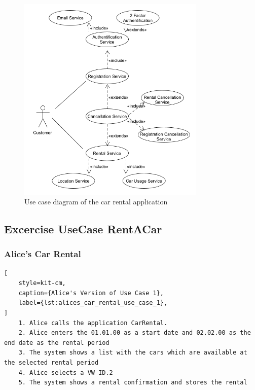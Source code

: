 \begin{figure}[H]
    \centering
    \includegraphics[width=0.8\textwidth]{figures/goLang/carRental/carRental_umlDiagram.png}
    \caption{Use case diagram of the car rental application}
    \label{fig:car_rental_use_case_diagram}
\end{figure}

\subsection{Excercise UseCase RentACar}
\label{sec:exercise_use_case_rent_a_car}
\subsubsection*{Alice's Car Rental}
\begin{lstlisting}[
    style=kit-cm,
    caption={Alice's Version of Use Case 1},
    label={lst:alices_car_rental_use_case_1},
]
    1. Alice calls the application CarRental.
    2. Alice enters the 01.01.00 as a start date and 02.02.00 as the end date as the rental period
    3. The system shows a list with the cars which are available at the selected rental period
    4. Alice selects a VW ID.2
    5. The system shows a rental confirmation and stores the rental
\end{lstlisting}
